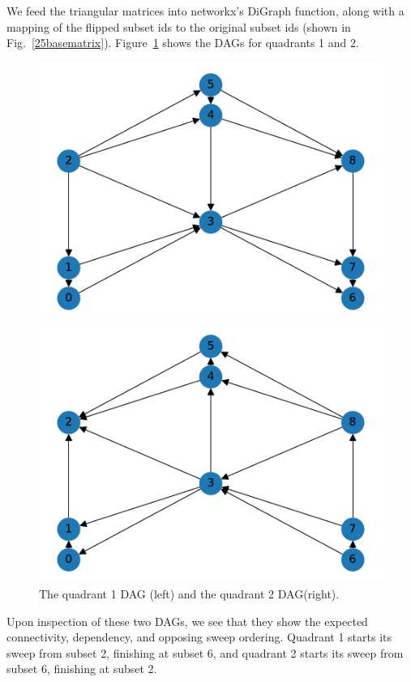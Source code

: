 We feed the triangular matrices into networkx's DiGraph function, along with a mapping of the flipped subset ids to the original subset ids (shown in Fig.~\ref{25basematrix}). Figure~\ref{25_q1q2graphs} shows the DAGs for quadrants 1 and 2.
\begin{figure}[H]
\begin{minipage}[c]{0.5\textwidth}
\includegraphics[scale=0.5]{../../figures/9_graph1.pdf}
\end{minipage}
\begin{minipage}[c]{0.5\textwidth}
\includegraphics[scale=0.5]{../../figures/9_graph2.pdf}
\end{minipage}
\caption{The quadrant 1 DAG (left) and the quadrant 2 DAG(right).}
\label{25_q1q2graphs}
\end{figure}
Upon inspection of these two DAGs, we see that they show the expected connectivity, dependency, and opposing sweep ordering.
Quadrant 1 starts its sweep from subset 2, finishing at subset 6, and quadrant 2 starts its sweep from subset 6, finishing at subset 2.

